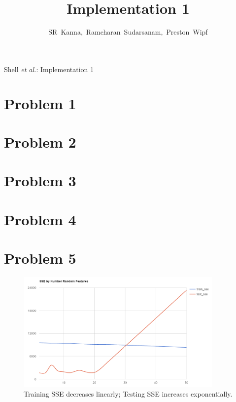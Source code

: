\documentclass[journal]{IEEEtran}
\begin{document}
\onecolumn

\title{Implementation 1}
\author{SR~Kanna,~Ramcharan~Sudarsanam,~Preston~Wipf}%

%
{Shell \MakeLowercase{\textit{et al.}}: Implementation 1}

\maketitle
\bigskip



\section{Problem 1}
\medskip

\section{Problem 2}
\medskip

\section{Problem 3}
\medskip

\section{Problem 4}
\medskip

\section{Problem 5}
\begin{figure}[!h]
\centering
\captionsetup{justification=centering,margin=2cm}
\includegraphics[width=0.9\textwidth]{sse_rand_features.PNG}
\caption{\label{fig:sse}Training SSE decreases linearly; Testing SSE increases exponentially.}
\end{figure}
\end{document}
